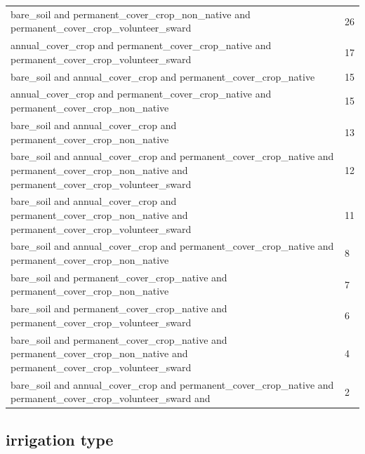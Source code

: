 \documentclass[review,12pt,authoryear]{elsarticle}
\begin{document}
\begin{linenumbers}
\begin{table}[]
\begin{tabular}{@{}ll@{}}
  bare_soil and permanent_cover_crop_non_native and permanent_cover_crop_volunteer_sward & 26 \\
  annual_cover_crop and permanent_cover_crop_native and permanent_cover_crop_volunteer_sward & 17 \\
  bare_soil and annual_cover_crop and permanent_cover_crop_native & 15 \\
  annual_cover_crop and permanent_cover_crop_native and permanent_cover_crop_non_native & 15 \\
  bare_soil and annual_cover_crop and permanent_cover_crop_non_native & 13 \\
  bare_soil and annual_cover_crop and permanent_cover_crop_native and permanent_cover_crop_non_native and permanent_cover_crop_volunteer_sward & 12 \\
  bare_soil and annual_cover_crop and permanent_cover_crop_non_native and permanent_cover_crop_volunteer_sward & 11 \\
  bare_soil and annual_cover_crop and permanent_cover_crop_native and permanent_cover_crop_non_native & 8 \\
  bare_soil and permanent_cover_crop_native and permanent_cover_crop_non_native & 7 \\
  bare_soil and permanent_cover_crop_native and permanent_cover_crop_volunteer_sward & 6 \\
  bare_soil and permanent_cover_crop_native and permanent_cover_crop_non_native and permanent_cover_crop_volunteer_sward & 4 \\
  bare_soil and annual_cover_crop and permanent_cover_crop_native and permanent_cover_crop_volunteer_sward and & 2 \\ \bottomrule
  \end{tabular}
  \end{table}

\subsection{irrigation type}


\end{linenumbers}
\end{document}
